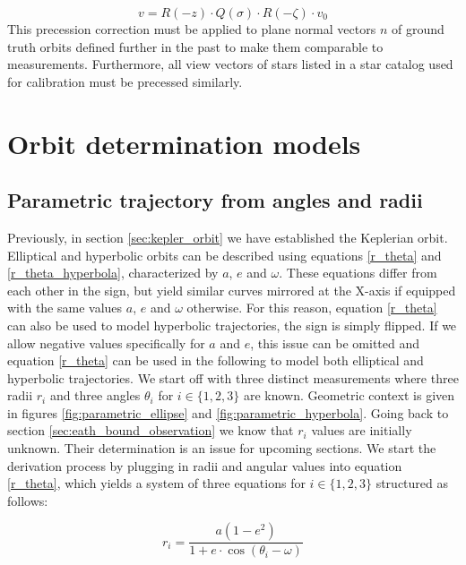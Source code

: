 \documentclass[11pt,a4paper]{article}
\begin{document}
	\begin{equation}
		v = R(-z)\cdot Q(\sigma)\cdot R(-\zeta)\cdot v_0
	\end{equation}
	\cite{precession_correction}
	\newline
	This precession correction must be applied to plane normal vectors $n$ of ground truth orbits defined further in the past to make them comparable to measurements. Furthermore, all view vectors of stars listed in a star catalog used for calibration must be precessed similarly.  
	
	
	\section{Orbit determination models}
	\subsection{Parametric trajectory from angles and radii}
	\label{sec:parametric_trajectory}
	Previously, in section \ref{sec:kepler_orbit} we have established the Keplerian orbit. Elliptical and hyperbolic orbits can be described using equations \ref{r_theta} and \ref{r_theta_hyperbola}, characterized by $a$, $e$ and $\omega$. These equations differ from each other in the sign, but yield similar curves mirrored at the X-axis if equipped with the same values $a$, $e$ and $\omega$ otherwise. For this reason, equation \ref{r_theta} can also be used to model hyperbolic trajectories, the sign is simply flipped. If we allow negative values specifically for $a$ and $e$, this issue can be omitted and equation \ref{r_theta} can be used in the following to model both elliptical and hyperbolic trajectories.\newline
	We start off with three distinct measurements where three radii $r_i$ and three angles $\theta_i$ for $i \in \{1,2,3\}$ are known. Geometric context is given in figures \ref{fig:parametric_ellipse} and \ref{fig:parametric_hyperbola}. Going back to section \ref{sec:eath_bound_observation} we know that $r_i$ values are initially unknown. Their determination is an issue for upcoming sections.\newline
	We start the derivation process by plugging in radii and angular values into equation \ref{r_theta}, which yields a system of three equations for $i \in \{1,2,3\}$ structured as follows:
	
	\begin{equation}\label{derivation_basis}
		r_i=\frac{a(1-e^2)}{1+e\cdot\cos(\theta_i-\omega)}
	\end{equation}
	
\end{document}
